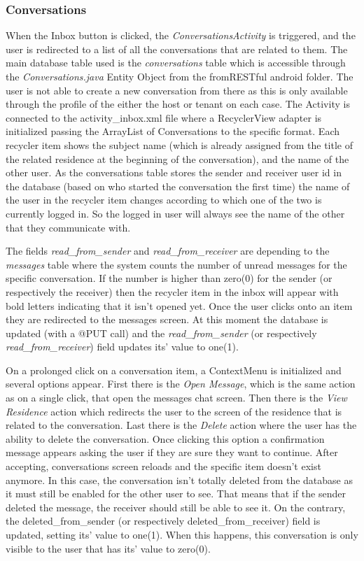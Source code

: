 \documentclass[12pt]{article}
\begin{document}
	\subsubsection{Conversations}
	When the Inbox button is clicked, the \textit{ConversationsActivity} is triggered, and the user is redirected to a list of all the conversations that are related to them. The main database table used is the \textit{conversations} table which is accessible through the \textit{Conversations.java} Entity Object from the fromRESTful android folder. The user is not able to create a new conversation from there as this is only available through the profile of the either the host or tenant on each case. The Activity is connected to the activity\_inbox.xml file where a RecyclerView adapter is initialized passing the ArrayList of Conversations to the specific format. Each recycler item shows the subject name (which is already assigned from the title of the related residence at the beginning of the conversation), and the name of the other user. As the conversations table stores the sender and receiver user id in the database (based on who started the conversation the first time) the name of the user in the recycler item changes according to which one of the two is currently logged in. So the logged in user will always see the name of the other that they communicate with. 
	
	The fields \textit{read\_from\_sender} and \textit{read\_from\_receiver} are depending to the \textit{messages} table where the system counts the number of unread messages for the specific conversation. If the number is higher than zero(0) for the sender (or respectively the receiver) then the recycler item in the inbox will appear with bold letters indicating that it isn't opened yet. Once the user clicks onto an item they are redirected to the messages screen. At this moment the database is updated (with a @PUT call) and the \textit{read\_from\_sender} (or respectively \textit{read\_from\_receiver}) field updates its' value to one(1). 
	
	On a prolonged click on a conversation item, a ContextMenu is initialized and several options appear. First there is the \textit{Open Message}, which is the same action as on a single click, that open the messages chat screen. Then there is the \textit{View Residence} action which redirects the user to the screen of the residence that is related to the conversation. Last there is the \textit{Delete} action where the user has the ability to delete the conversation. Once clicking this option a confirmation message appears asking the user if they are sure they want to continue. After accepting, conversations screen reloads and the specific item doesn't exist anymore. In this case, the conversation isn't totally deleted from the database as it must still be enabled for the other user to see. That means that if the sender deleted the message, the receiver should still be able to see it. On the contrary, the deleted\_from\_sender (or respectively deleted\_from\_receiver) field is updated, setting its' value to one(1). When this happens, this conversation is only visible to the user that has its' value to zero(0).
	
\end{document}
